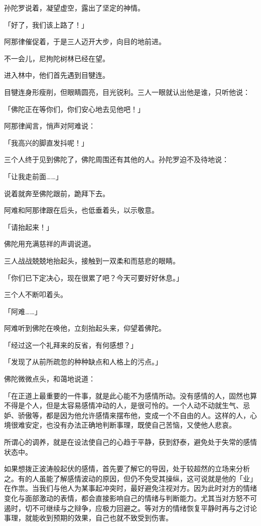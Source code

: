 \documentclass[twoside,openany]{book}
\begin{document}
孙陀罗说着，凝望虚空，露出了坚定的神情。

「好了，我们该上路了！」

阿那律催促着，于是三人迈开大步，向目的地前进。

不一会儿，尼拘陀树林已经在望。

进入林中，他们首先遇到目犍连。

目犍连身形瘦削，但眼睛圆亮，目光锐利。三人一眼就认出他是谁，只听他说：

「佛陀正在等你们，你们安心地去见他吧！」

阿那律闻言，悄声对阿难说：

「我高兴的脚直发抖呢！」

三个人终于见到佛陀了，佛陀周围还有其他的人。孙陀罗迫不及待地说：

「让我走前面……」

说着就奔至佛陀跟前，跪拜下去。

阿难和阿那律跟在后头，也低垂着头，以示敬意。

「请抬起来！」

佛陀用充满慈祥的声调说道。

三人战战兢兢地抬起头，接触到一双柔和而慈悲的眼睛。

「你们已下定决心，现在很累了吧？今天可要好好休息。」

三个人不断叩着头。

「阿难……」

阿难听到佛陀在唤他，立刻抬起头来，仰望着佛陀。

「经过这一个礼拜来的反省，有何感想？」





「发现了从前所疏忽的种种缺点和人格上的污点。」

佛陀微微点头，和蔼地说道：

「在正道上最重要的一件事，就是此心能不为感情所动。没有感情的人，固然也算不得是个人，但是太容易感情冲动的人，是很可怜的。一个人动不动就生气、忌妒、骄傲等，都是因为他允许感情来摆布他，变成一个不自由的人。这样的人，心境很难安定，也没有办法正确地判断事理，既使自己苦恼，又使他人悲哀。

所谓心的调养，就是在设法使自己的心趋于平静，获到舒泰，避免处于失常的感情状态中。

如果想拨正波涛般起伏的感情，首先要了解它的导因，处于较超然的立场来分析之。有的人虽能了解感情波动的原因，但仍不免受其操纵，这可说就是他的「业」在作祟。当我们与他人为某事起冲突时，最好避免注视对方。因为此时对方的情绪变化与面部激动的表情，都会直接影响自己的情绪与判断能力。尤其当对方怒不可遏时，切不可继续与之辩争，应极力回避之。等对方的情绪恢复平静时再与之讨论事理，就能收到预期的效果，自己也就不致受到伤害。
\end{document}
